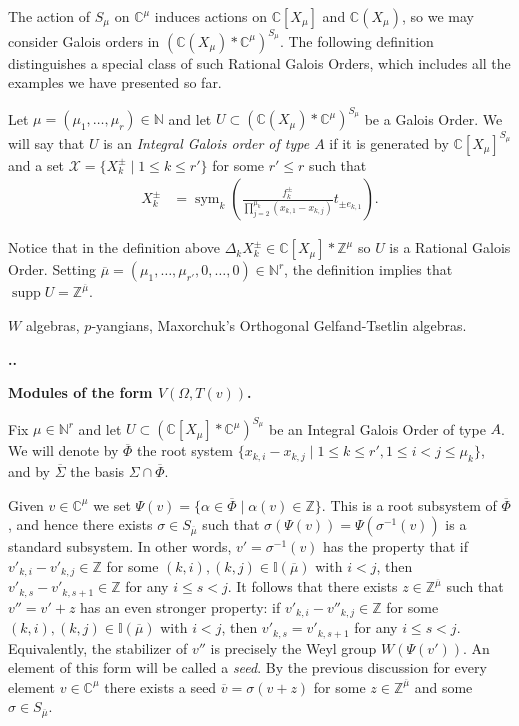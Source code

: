 \documentclass[11pt,fleqn]{amsart}
\renewcommand\thesection{\arabic{section}}
\newcounter{para}[section]
\renewcommand\thepara{\thesection.\arabic{para}}
\def\paragraph{%
 \noindent
 \refstepcounter{para}%
 \textbf{\thepara.}\hspace{1ex}%
}
\newcommand\about[1]{%
 {\bfseries#1.}%
}
\newcommand\NN{\mathbb N}
\newcommand\CC{\mathbb C}
\newcommand\ZZ{\mathbb Z}
\newcommand\II{\mathbb I}
\newcommand\vv{\overline{v}}
\DeclareMathOperator\sym{sym}
\DeclareMathOperator\supp{supp}
\begin{document}
The action of $S_\mu$ on $\CC^\mu$ induces actions on $\CC[X_\mu]$ and 
$\CC(X_\mu)$, so we may consider Galois orders in $(\CC(X_\mu) * 
\CC^\mu)^{S_\mu}$. The following definition distinguishes a special class of 
such Rational Galois Orders, which includes all the examples we have presented
so far.

\begin{Definition}
Let $\mu = (\mu_1, \ldots, \mu_r) \in \NN$ and let $U \subset (\CC(X_\mu) * 
\CC^\mu)^{S_\mu}$ be a Galois Order. We will say that $U$ is an \emph{Integral 
Galois order of type $A$} if it is generated by $\CC[X_\mu]^{S_\mu}$ and a set 
$\mathcal X = \{X_k^\pm \mid 1 \leq k \leq r'\}$ for some $r' \leq r$ such that
\begin{align*}
X_k^\pm 
	&= \sym_k \left( 
		\frac{f_k^\pm}{\prod_{j = 2}^{\mu_k}(x_{k,1} - x_{k,j})} 
			t_{\pm e_{k,1}}
	\right).
\end{align*}
\end{Definition}
Notice that in the definition above $\Delta_k X_k^\pm \in \CC[X_\mu] * 
\ZZ^\mu$ so $U$ is a Rational Galois Order. Setting $\overline \mu = (\mu_1, 
\ldots, \mu_{r'}, 0, \ldots, 0) \in \NN^r$, the definition implies that $\supp 
U = \ZZ^{\overline \mu}$. 

\begin{Example*}
$W$ algebras, $p$-yangians, Maxorchuk's Orthogonal Gelfand-Tsetlin algebras.
\end{Example*}

\paragraph
\about{Modules of the form $V(\Omega, T(v))$}
Fix $\mu \in \NN^r$ and let $U \subset (\CC[X_\mu] * \CC^\mu)^{S_\mu}$ be an
Integral Galois Order of type $A$. We will denote by $\overline \Phi$ the root 
system $\{x_{k,i} - x_{k,j} \mid 1 \leq k \leq r', 1 \leq i < j \leq \mu_k\}$, 
and by $\overline \Sigma$ the basis $\Sigma \cap \overline \Phi$. 

Given $v \in \CC^\mu$ we set $\Psi(v) = \{\alpha \in \overline \Phi \mid 
\alpha(v) \in \ZZ\}$. This is a root subsystem of $\overline \Phi$, and hence 
there exists $\sigma \in S_{\overline \mu}$ such that $\sigma(\Psi(v)) = 
\Psi(\sigma^{-1}(v))$ is a standard subsystem. In other words, $v' = 
\sigma^{-1}(v)$ has the property that if $v'_{k,i} - v'_{k,j} \in \ZZ$ for some
$(k,i), (k,j) \in \II(\overline \mu)$ with $i < j$, then $v'_{k,s} - v'_{k,s+1}
\in \ZZ$ for any $i \leq s < j$. It follows that there exists $z \in 
\ZZ^{\overline \mu}$ such that $v'' = v'+z$ has an even stronger property:
if $v'_{k,i} - v''_{k,j} \in \ZZ$ for some $(k,i), (k,j) \in 
\II(\overline \mu)$ with $i < j$, then $v'_{k,s} = v'_{k,s+1}$ for any $i \leq 
s < j$. Equivalently, the stabilizer of $v''$ is precisely the Weyl group
$W(\Psi(v'))$. An element of this form will be called a \emph{seed}. By the
previous discussion for every element $v \in \CC^\mu$ there exists a seed
$\vv = \sigma(v + z)$ for some $z \in \ZZ^{\overline \mu}$ and some $\sigma \in
S_{\overline \mu}$. 
\end{document}
